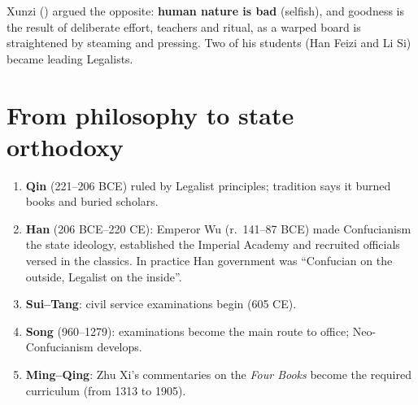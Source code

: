 Xunzi () argued the opposite: \textbf{human nature is bad} (selfish), and
goodness is the result of deliberate effort, teachers and ritual, as a warped board is
straightened by steaming and pressing. Two of his students (Han Feizi and Li Si) became
leading Legalists.

\begin{center}
\end{center}

\section{From philosophy to state orthodoxy}

\begin{enumerate}
  \item \textbf{Qin} (221--206 BCE) ruled by Legalist principles; tradition says it burned
        books and buried scholars.
  \item \textbf{Han} (206 BCE--220 CE): Emperor Wu (r.\ 141--87 BCE) made Confucianism the
        state ideology, established the Imperial Academy and recruited officials versed in
        the classics. In practice Han government was ``Confucian on the outside, Legalist on
        the inside''.
  \item \textbf{Sui--Tang}: civil service examinations begin (605 CE).
  \item \textbf{Song} (960--1279): examinations become the main route to office;
        Neo-Confucianism develops.
  \item \textbf{Ming--Qing}: Zhu Xi's commentaries on the \emph{Four Books} become the
        required curriculum (from 1313 to 1905).
\end{enumerate}


